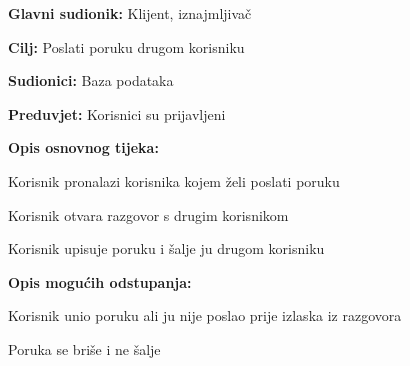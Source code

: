 						\noindent {}
						\begin{packed_item}
							
							\item \textbf{Glavni sudionik: }Klijent, iznajmljivač
							\item  \textbf{Cilj: }Poslati poruku drugom korisniku
							\item  \textbf{Sudionici: }Baza podataka
							\item  \textbf{Preduvjet: }Korisnici su prijavljeni
							\item  \textbf{Opis osnovnog tijeka:}
							
							\item[] \begin{packed_enum}
								
								\item Korisnik pronalazi korisnika kojem želi poslati poruku 
								\item Korisnik otvara razgovor s drugim korisnikom
								\item Korisnik upisuje poruku i šalje ju drugom korisniku    
							\end{packed_enum}
							
							\item  \textbf{Opis mogućih odstupanja:}
							
							\item[] \begin{packed_item}
								
								\item[3.a] Korisnik unio poruku ali ju nije poslao prije izlaska iz razgovora
								\item[] \begin{packed_enum}
									
									\item Poruka se briše i ne šalje 
									
									
								\end{packed_enum}
								
							\end{packed_item}
						\end{packed_item}
						\noindent {}
